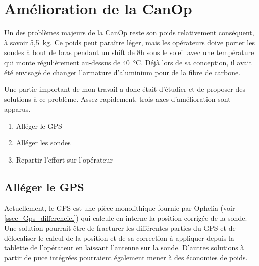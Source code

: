 \section{Amélioration de la CanOp}

Un des problèmes majeurs de la CanOp reste son poids relativement conséquent, à savoir 5,5~kg. Ce poids peut paraître léger, mais les opérateurs doive porter les sondes à bout de bras pendant un shift de 8h sous le soleil avec une température qui monte régulièrement au-dessus de 40~°C. Déjà lors de sa conception, il avait été envisagé de changer l'armature d'aluminium pour de la fibre de carbone.

Une partie important de mon travail a donc était d'étudier et de proposer des solutions à ce problème. Assez rapidement, trois axes d'amélioration sont apparus.
\begin{enumerate}
    \item Alléger le GPS
    \item Alléger les sondes
    \item Repartir l'effort sur l'opérateur
\end{enumerate}

\subsection{Alléger le GPS}
Actuellement, le GPS est une pièce monolithique fournie par Ophelia (voir \cref{ssec_Gps_differenciel}) qui calcule en interne la position corrigée de la sonde. Une solution pourrait être de fracturer les différentes parties du GPS et de délocaliser le calcul de la position et de sa correction à appliquer depuis la tablette de l'opérateur en laissant l'antenne sur la sonde. D'autres solutions à partir de puce intégrées pourraient également mener à des économies de poids.

